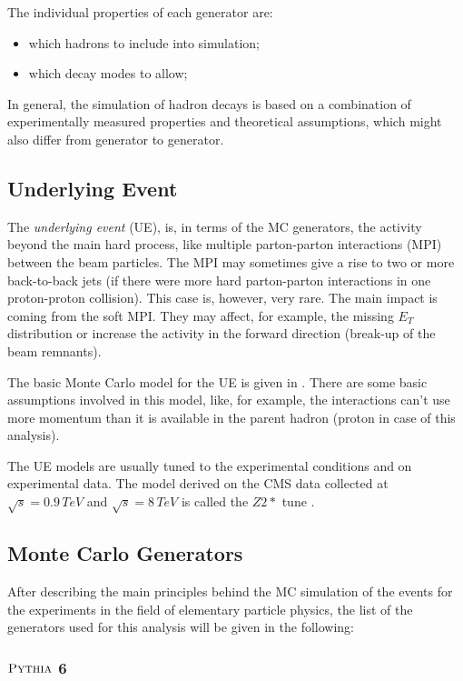 The individual properties of each generator are:

\begin{itemize}
 \item which hadrons to include into simulation;
 \item which decay modes to allow;
\end{itemize}

In general, the simulation of hadron decays is based on a combination of experimentally measured properties and theoretical assumptions, which
might also differ from generator to generator.

\subsection{Underlying Event}

The \textit{underlying event} (UE), is, in terms of the MC generators, the activity beyond the main hard process, like multiple parton-parton interactions
(MPI) between the beam particles. The MPI may sometimes give a rise to two or more back-to-back jets (if there were more hard parton-parton interactions
in one proton-proton collision). This case is, however, very rare. The main impact is coming from the soft MPI. They may affect, for example, the 
missing $E_{T}$ distribution or increase the activity in the forward direction (break-up of the beam remnants).

The basic Monte Carlo model for the UE is given in \cite{PhysRevD.36.2019}. There are some basic assumptions involved in
this model, like, for example, the interactions can't use more momentum than it is available in the parent hadron (proton in case of this analysis).

The UE models are usually tuned to the experimental conditions and on experimental data. The model derived on the CMS data collected at $\sqrt{s} = 0.9\, TeV$
and $\sqrt{s} = 8\,TeV$ is called the $Z2*$ tune \cite{Chatrchyan:2011id}.


\subsection{Monte Carlo Generators}

After describing the main principles behind the MC simulation of the events for the experiments in the field of elementary particle
physics, the list of the generators used for this analysis will be given in the following:

\subsubsection{$\textsc{Pythia}$ 6}

